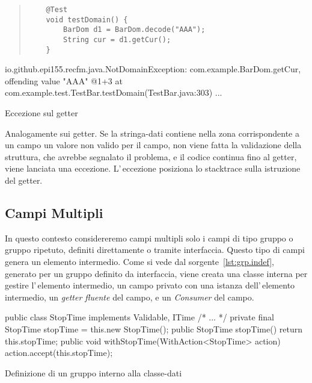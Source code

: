 \documentclass[a4paper,10pt]{report}
\newenvironment{elisting}[1][H]
  {\captionsetup{aboveskip=0pt}\begin{listing}[#1]}
  {\end{listing}%
}
\begin{document}
\begin{elisting}[!htb]
\begin{quote}
\begin{verbatim}
    @Test
    void testDomain() {
        BarDom d1 = BarDom.decode("AAA");
        String cur = d1.getCur();
    }
\end{verbatim}
\end{quote}
\vspace*{-1cm}
\begin{javacode}
io.github.epi155.recfm.java.NotDomainException: com.example.BarDom.getCur, offending value "AAA" @1+3
	at com.example.test.TestBar.testDomain(TestBar.java:303)
	...
\end{javacode}
\caption{Eccezione sul getter}
\label{lst:get.throw}
\end{elisting}
Analogamente sui getter. Se la stringa-dati contiene nella zona corrispondente 
a un campo un valore non valido per il campo, non viene fatta la validazione 
della struttura, che avrebbe segnalato il problema, e il codice continua fino 
al getter, viene lanciata una eccezione.
L'\,eccezione posiziona lo stacktrace sulla istruzione del getter.

\subsection{Campi Multipli}
In questo contesto considereremo campi multipli solo i campi di tipo gruppo o
gruppo ripetuto, definiti direttamente o tramite interfaccia.
Questo tipo di campi genera un elemento intermedio.
Come si vede dal sorgente~\ref{lst:grp.indef}, generato per un gruppo definito
da interfaccia, viene creata una classe interna per gestire l'\,elemento 
intermedio, un campo privato con una istanza dell'\,elemento intermedio, un
\textit{getter fluente} del campo, e un \textit{Consumer} del campo.

\begin{elisting}[!htb]
\begin{javacode}
    public class StopTime implements Validable, ITime {/* ... */}
    private final StopTime stopTime = this.new StopTime();
    public StopTime stopTime() { return this.stopTime; }
    public void withStopTime(WithAction<StopTime> action) { action.accept(this.stopTime); }
\end{javacode}
\caption{Definizione di un gruppo interno alla classe-dati}
\label{lst:grp.indef}
\end{elisting}
\end{document}

